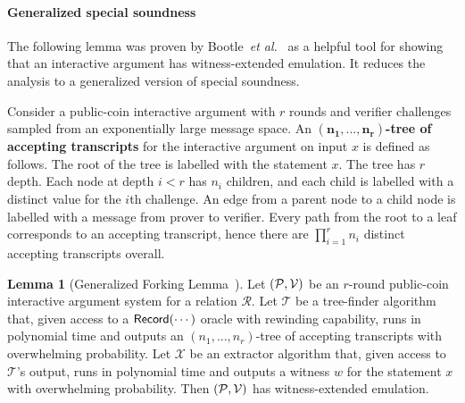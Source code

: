 \documentclass{article}
\theoremstyle{definition}
\newtheorem{lemma}{Lemma}
\begin{document}
\paragraph{Generalized special soundness} The following lemma was proven by Bootle~\emph{et al.}~\cite{EC:BCCGP16} as a helpful tool for showing that an interactive argument has witness-extended emulation. It reduces the analysis to a generalized version of special soundness. 

Consider a public-coin interactive argument with $r$ rounds and verifier challenges sampled from an exponentially large message space. An \textbf{$\mathbf{(n_1,...,n_r)}$-tree of accepting transcripts} for the interactive argument on input $x$ is defined as follows. The root of the tree is labelled with the statement $x$. The tree has $r$ depth. Each node at depth $i < r$ has $n_i$ children, and each child is labelled with a distinct value for the $i$th challenge. An edge from a parent node to a child node is labelled with a message from prover to verifier. Every path from the root to a leaf corresponds to an accepting transcript, hence there are $\prod_{i=1}^r n_i$ distinct accepting transcripts overall. 

\begin{lemma}[Generalized Forking Lemma~\cite{EC:BCCGP16}] \label{lemma:GFL}
Let $(\mathcal{P}, \mathcal{V})$ be an $r$-round public-coin interactive argument system for a relation $\mathcal{R}$. Let $\mathcal{T}$ be a tree-finder algorithm that, given access to a $\textsf{{Record}}(\cdots)$ oracle with rewinding capability, runs in polynomial time and outputs an $({n_1}, \ldots, {n_r})$-tree of accepting transcripts with overwhelming probability. Let $\mathcal{X}$ be an extractor algorithm that, given access to $\mathcal{T}$'s output, runs in polynomial time and outputs a witness $w$ for the statement $x$ with overwhelming probability. Then $(\mathcal{P}, \mathcal{V})$ has witness-extended emulation.
\end{lemma}
\end{document}
